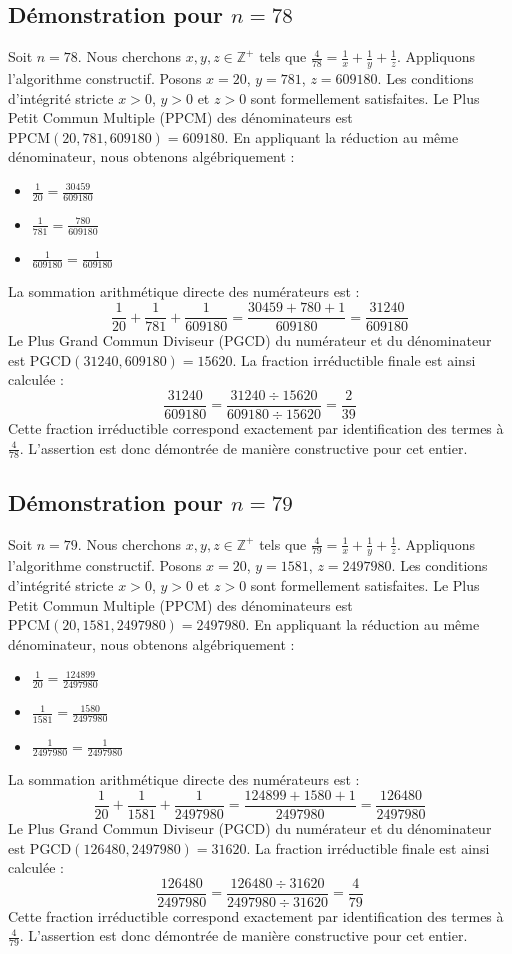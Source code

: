 \documentclass[11pt,a4paper]{article}
\begin{document}
\subsection{Démonstration pour $n = 78$}
Soit $n = 78$. Nous cherchons $x, y, z \in \mathbb{Z}^{+}$ tels que $\frac{4}{78} = \frac{1}{x} + \frac{1}{y} + \frac{1}{z}$.
Appliquons l'algorithme constructif. Posons $x = 20$, $y = 781$, $z = 609180$.
Les conditions d'intégrité stricte $x > 0$, $y > 0$ et $z > 0$ sont formellement satisfaites.
Le Plus Petit Commun Multiple (PPCM) des dénominateurs est $\text{PPCM}(20, 781, 609180) = 609180$.
En appliquant la réduction au même dénominateur, nous obtenons algébriquement :
\begin{itemize}
    \item $\frac{1}{20} = \frac{30459}{609180}$
    \item $\frac{1}{781} = \frac{780}{609180}$
    \item $\frac{1}{609180} = \frac{1}{609180}$
\end{itemize}
La sommation arithmétique directe des numérateurs est :
$$ \frac{1}{20} + \frac{1}{781} + \frac{1}{609180} = \frac{30459 + 780 + 1}{609180} = \frac{31240}{609180} $$
Le Plus Grand Commun Diviseur (PGCD) du numérateur et du dénominateur est $\text{PGCD}(31240, 609180) = 15620$.
La fraction irréductible finale est ainsi calculée :
$$ \frac{31240}{609180} = \frac{31240 \div 15620}{609180 \div 15620} = \frac{2}{39} $$
Cette fraction irréductible correspond exactement par identification des termes à $\frac{4}{78}$. L'assertion est donc démontrée de manière constructive pour cet entier.

\subsection{Démonstration pour $n = 79$}
Soit $n = 79$. Nous cherchons $x, y, z \in \mathbb{Z}^{+}$ tels que $\frac{4}{79} = \frac{1}{x} + \frac{1}{y} + \frac{1}{z}$.
Appliquons l'algorithme constructif. Posons $x = 20$, $y = 1581$, $z = 2497980$.
Les conditions d'intégrité stricte $x > 0$, $y > 0$ et $z > 0$ sont formellement satisfaites.
Le Plus Petit Commun Multiple (PPCM) des dénominateurs est $\text{PPCM}(20, 1581, 2497980) = 2497980$.
En appliquant la réduction au même dénominateur, nous obtenons algébriquement :
\begin{itemize}
    \item $\frac{1}{20} = \frac{124899}{2497980}$
    \item $\frac{1}{1581} = \frac{1580}{2497980}$
    \item $\frac{1}{2497980} = \frac{1}{2497980}$
\end{itemize}
La sommation arithmétique directe des numérateurs est :
$$ \frac{1}{20} + \frac{1}{1581} + \frac{1}{2497980} = \frac{124899 + 1580 + 1}{2497980} = \frac{126480}{2497980} $$
Le Plus Grand Commun Diviseur (PGCD) du numérateur et du dénominateur est $\text{PGCD}(126480, 2497980) = 31620$.
La fraction irréductible finale est ainsi calculée :
$$ \frac{126480}{2497980} = \frac{126480 \div 31620}{2497980 \div 31620} = \frac{4}{79} $$
Cette fraction irréductible correspond exactement par identification des termes à $\frac{4}{79}$. L'assertion est donc démontrée de manière constructive pour cet entier.
\end{document}
